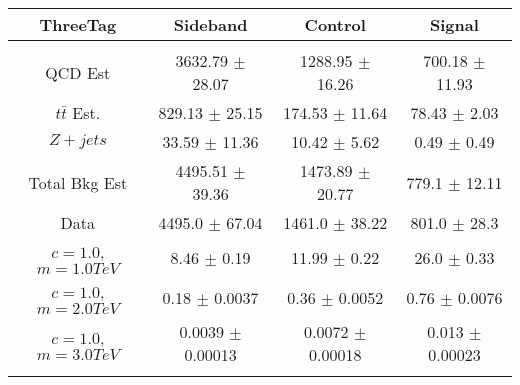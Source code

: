 \begin{footnotesize} 
\begin{tabular}{c|c|c|c} 
ThreeTag & Sideband & Control & Signal \\ 
\hline\hline 
& & & \\ 
QCD Est & 3632.79 $\pm$ 28.07 & 1288.95 $\pm$ 16.26 & 700.18 $\pm$ 11.93\\ 
$t\bar{t}$ Est.  & 829.13 $\pm$ 25.15 & 174.53 $\pm$ 11.64 & 78.43 $\pm$ 2.03\\ 
$Z+jets$ & 33.59 $\pm$ 11.36 & 10.42 $\pm$ 5.62 & 0.49 $\pm$ 0.49\\ 
Total Bkg Est & 4495.51 $\pm$ 39.36 & 1473.89 $\pm$ 20.77 & 779.1 $\pm$ 12.11\\ 
Data & 4495.0 $\pm$ 67.04 & 1461.0 $\pm$ 38.22 & 801.0 $\pm$ 28.3\\ 
$c=1.0$,$m=1.0TeV$ & 8.46 $\pm$ 0.19 & 11.99 $\pm$ 0.22 & 26.0 $\pm$ 0.33\\ 
$c=1.0$,$m=2.0TeV$ & 0.18 $\pm$ 0.0037 & 0.36 $\pm$ 0.0052 & 0.76 $\pm$ 0.0076\\ 
$c=1.0$,$m=3.0TeV$ & 0.0039 $\pm$ 0.00013 & 0.0072 $\pm$ 0.00018 & 0.013 $\pm$ 0.00023\\ 
& & & \\ 
\hline\hline 
\end{tabular} 
\end{footnotesize} 
\newline 
